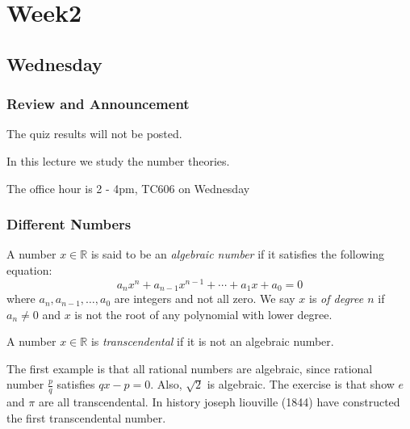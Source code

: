 
\chapter{Week2}
\section{Wednesday}
\subsection{Review and Announcement}
The quiz results will not be posted.

In this lecture we study the number theories.

The office hour is 2 - 4pm, TC606 on Wednesday
\subsection{Different Numbers}
\begin{definition}
A number $x\in\mathbb{R}$ is said to be an \emph{algebraic number} if it satisfies the following equation:
\begin{equation}
a_nx^n+a_{n-1}x^{n-1}+\cdots+a_1x+a_0=0
\end{equation}
where $a_n,a_{n-1},\dots,a_0$ are integers and not all zero. We say $x$ is \emph{of degree $n$} if $a_n\ne0$ and $x$ is not the root of any polynomial with lower degree.
\end{definition}
\begin{definition}
A number $x\in\mathbb{R}$ is \emph{transcendental} if it is not an algebraic number.
\end{definition}

The first example is that all rational numbers are algebraic, since rational number $\frac{p}{q}$ satisfies $qx-p=0$. Also, $\sqrt{2}$ is algebraic. The exercise is that show $e$ and $\pi$ are all transcendental. In history joseph liouville (1844) have constructed the first transcendental number.

